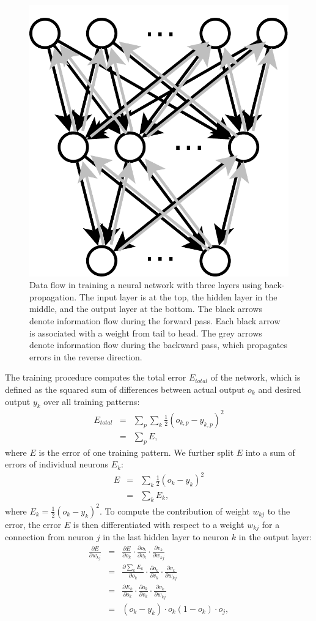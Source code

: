 \begin{figure}
\begin{centering}
\includegraphics[width=0.34\columnwidth]{images/introduction-backpropagation-data-flow}
\par\end{centering}
\caption[Data flow in training a neural network using back-propagation.]{\label{fig:Data-flow-in-back-propagation}Data flow in training a
neural network with three layers using back-propagation. The input
layer is at the top, the hidden layer in the middle, and the output
layer at the bottom. The black arrows denote information flow during
the forward pass. Each black arrow is associated with a weight from
tail to head. The grey arrows denote information flow during the backward
pass, which propagates errors in the reverse direction.}
\end{figure}
The training procedure computes the total error $E_{total}$ of the
network, which is defined as the squared sum of differences between
actual output $o_{k}$ and desired output $y_{k}$ over all training
patterns:
\begin{eqnarray}
E_{total} & = & \sum_{p}\sum_{k}\frac{1}{2}(o_{k,p}-y_{k,p})^{2}\\
 & = & \sum_{p}E,\nonumber 
\end{eqnarray}
 where $E$ is the error of one training pattern. We further split
$E$ into a sum of errors of individual neurons $E_{k}$: 
\begin{eqnarray}
E & = & \sum_{k}\frac{1}{2}(o_{k}-y_{k})^{2}\\
 & = & \sum_{k}E_{k},\nonumber 
\end{eqnarray}
where $E_{k}=\frac{1}{2}(o_{k}-y_{k})^{2}$. To compute the contribution
of weight $w_{kj}$ to the error, the error $E$ is then differentiated
with respect to a weight $w_{kj}$ for a connection from neuron $j$
in the last hidden layer to neuron $k$ in the output layer: 
\begin{eqnarray}
\frac{\partial E}{\partial w_{kj}} & = & \frac{\partial E}{\partial o_{k}}\cdot\frac{\partial o_{k}}{\partial v_{k}}\cdot\frac{\partial v_{k}}{\partial w_{kj}}\nonumber \\
 & = & \frac{\partial\sum_{k}E_{k}}{\partial o_{k}}\cdot\frac{\partial o_{k}}{\partial v_{k}}\cdot\frac{\partial v_{k}}{\partial w_{kj}}\nonumber \\
 & = & \frac{\partial E_{k}}{\partial o_{k}}\cdot\frac{\partial o_{k}}{\partial v_{k}}\cdot\frac{\partial v_{k}}{\partial w_{kj}}\label{eq:backpropagation-error-wrt-weight-output-layer}\\
 & = & (o_{k}-y_{k})\cdot o_{k}(1-o_{k})\cdot o_{j},\nonumber 
\end{eqnarray}
